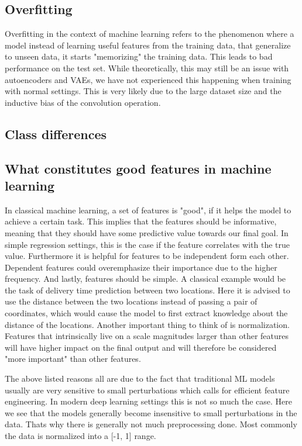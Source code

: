 \subsection{Overfitting}\label{subsec:overfitting}
Overfitting in the context of machine learning refers to the phenomenon where
a model instead of learning useful features from the training data, that
generalize to unseen data, it starts "memorizing" the training data. This
leads to bad performance on the test set. While theoretically, this may still
be an issue with autoencoders and VAEs, we have not experienced this happening
when training with normal settings. This is very likely due to the large
dataset size and the inductive bias of the convolution operation.

\subsection{Class differences}

\subsection{What constitutes good features in machine learning}
In classical machine learning, a set of features is "good", if it helps the
model to achieve a certain task. This implies that the features should be
informative, meaning that they should have some predictive value towards our
final goal. In simple regression settings, this is the case if the feature
correlates with the true value. Furthermore it is helpful for features to be
independent form each other. Dependent features could overemphasize their
importance due to the higher frequency. And lastly, features should be simple.
A classical example would be the task of delivery time prediction between two
locations. Here it is advised to use the distance between the two locations
instead of passing a pair of coordinates, which would cause the model to first
extract knowledge about the distance of the locations. Another important thing
to think of is normalization. Features that intrinsically live on a scale
magnitudes larger than other features will have higher impact on the final
output and will therefore be considered "more important" than other features.

The above listed reasons all are due to the fact that traditional ML models
usually are very sensitive to small perturbations which calls for efficient
feature engineering. In modern deep learning settings this is not so much the
case. Here we see that the models generally become insensitive to small
perturbations in the data. Thats why there is generally not much preprocessing
done. Most commonly the data is normalized into a [-1, 1] range.
